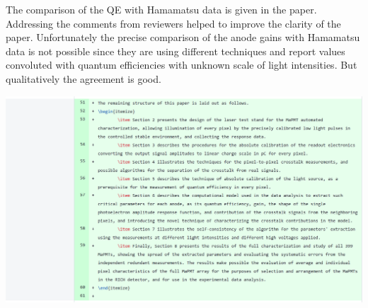 \documentclass[11pt]{report}
\begin{document}
The comparison of the QE with Hamamatsu data is given in the paper.
Addressing the comments from reviewers helped to improve the clarity of the paper.
Unfortunately the precise comparison of the anode gains with Hamamatsu data is not possible since they are using different techniques and report values convoluted with quantum efficiencies with unknown scale of light intensities.
But qualitatively the agreement is good.



\clearpage




\begin{tcolorbox}[enlarge top by=2em,colbacktitle=red!60!white,colframe=black!80!white,left=0pt,right=0pt,top=0pt,bottom=0pt,boxrule=0.3pt,title=\bfseries Addition 1]
\end{tcolorbox}

\includegraphics[width=\linewidth]{round1/add1.png}
\end{document}
